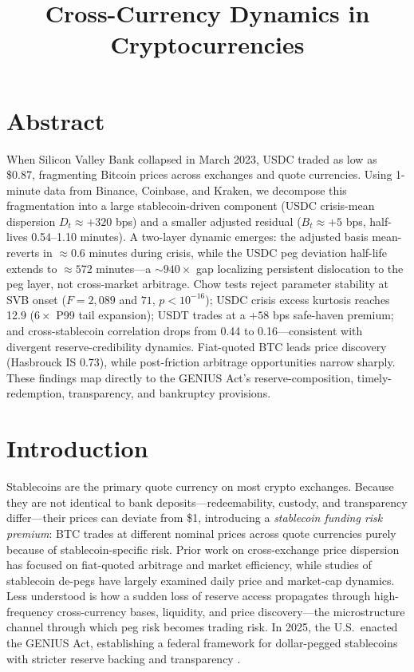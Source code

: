 \documentclass[12pt]{article}
\title{\vspace{-1.4cm}Cross-Currency Dynamics in Cryptocurrencies \vspace{-0.7cm}}
\author{}
\date{}
\begin{document}
\maketitle
\vspace{-1.4cm}

\section*{Abstract}
When Silicon Valley Bank collapsed in March 2023, USDC traded as low as \$0.87, fragmenting Bitcoin prices across exchanges and quote currencies. Using 1-minute data from Binance, Coinbase, and Kraken, we decompose this fragmentation into a large stablecoin-driven component (USDC crisis-mean dispersion $D_t\approx{+}320$ bps) and a smaller adjusted residual ($B_t\approx{+}5$ bps, half-lives 0.54--1.10 minutes). A two-layer dynamic emerges: the adjusted basis mean-reverts in ${\approx}0.6$ minutes during crisis, while the USDC peg deviation half-life extends to ${\approx}572$ minutes---a ${\sim}940\times$ gap localizing persistent dislocation to the peg layer, not cross-market arbitrage. Chow tests reject parameter stability at SVB onset ($F{=}2{,}089$ and $71$, $p{<}10^{-16}$); USDC crisis excess kurtosis reaches 12.9 ($6\times$ P99 tail expansion); USDT trades at a ${+}58$ bps safe-haven premium; and cross-stablecoin correlation drops from 0.44 to 0.16---consistent with divergent reserve-credibility dynamics. Fiat-quoted BTC leads price discovery (Hasbrouck IS 0.73), while post-friction arbitrage opportunities narrow sharply. These findings map directly to the GENIUS Act's reserve-composition, timely-redemption, transparency, and bankruptcy provisions.

\section{Introduction}

Stablecoins are the primary quote currency on most crypto exchanges. Because they are not identical to bank deposits---redeemability, custody, and transparency differ---their prices can deviate from \$1, introducing a \emph{stablecoin funding risk premium}: BTC trades at different nominal prices across quote currencies purely because of stablecoin-specific risk. Prior work on cross-exchange price dispersion has focused on fiat-quoted arbitrage and market efficiency, while studies of stablecoin de-pegs have largely examined daily price and market-cap dynamics. Less understood is how a sudden loss of reserve access propagates through high-frequency cross-currency bases, liquidity, and price discovery---the microstructure channel through which peg risk becomes trading risk. In 2025, the U.S.\ enacted the GENIUS Act, establishing a federal framework for dollar-pegged stablecoins with stricter reserve backing and transparency \cite{genius2025}.
\end{document}
